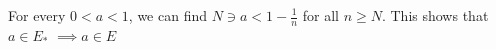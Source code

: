 \documentclass[preview]{standalone}
\begin{document}
\begin{center}
For every $0 \lt a \lt 1$, we can find $N \ni a \lt 1-\frac{1}{n}$ for all $n \geq N$. This shows that $a \in E_*$ $\implies a \in E$
\end{center}
\end{document}
